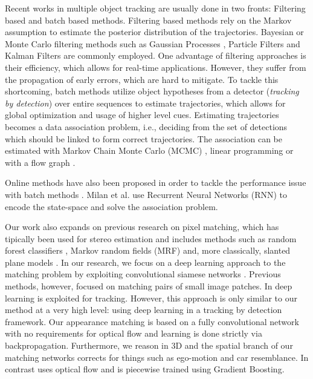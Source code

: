 \documentclass[letterpaper, 10 pt, conference]{ieeeconf}  \pdfminorversion=4
\begin{document}
Recent works in multiple object tracking are usually done in two fronts: Filtering based and batch based methods. Filtering based methods rely on the Markov assumption to estimate the posterior distribution of the trajectories.   Bayesian or Monte Carlo filtering methods such as Gaussian Processes \cite{urtasun20063d}, Particle Filters and Kalman Filters \cite{thrun2005probabilistic} are commonly employed. One advantage of filtering approaches is their efficiency, which allows for real-time applications. However, they suffer from the propagation of early errors, which are hard to mitigate. To tackle this shortcoming, batch methods utilize object hypotheses from a detector (\textit{tracking by detection}) over entire sequences to estimate trajectories, which allows for global optimization and usage of higher level cues. Estimating trajectories becomes a data association problem, i.e., deciding from the set of detections which should be linked to form correct trajectories. The association   can be estimated with  Markov Chain Monte Carlo (MCMC) \cite{Collins2014,choi_pami13}, linear programming \cite{berclaz,shitrit} or with a flow graph \cite{mincostflow}.

Online methods have also been proposed in order to tackle the performance issue with batch methods \cite{onlinemcf,onlinecrf}. Milan et al. \cite{milan2016online} use Recurrent Neural Networks (RNN) to encode the state-space and solve the association problem.

Our work also expands on previous research on pixel matching, which has tipically been used for stereo estimation and includes methods such as random forest classifiers \cite{rf_matching}, Markov random fields (MRF) \cite{mrf_matching} and, more classically, slanted plane models \cite{slanted_matching}. In our research, we focus on a deep learning approach to the matching problem by exploiting   convolutional siamese networks \cite{matching, stereomatching}. Previous methods, however,  focused on matching pairs of small image patches.  In \cite{damnpaper} deep learning is exploited for tracking. However, this approach is only similar to our method at a very high level: using deep learning in a tracking by detection framework. Our appearance matching is based on a fully convolutional network with no requirements for optical flow and learning is done strictly via backpropagation. Furthermore, we reason in 3D and the spatial branch of our matching networks corrects for things such as ego-motion and car resemblance. In contrast \cite{damnpaper} uses optical flow and is piecewise trained using Gradient Boosting.
\end{document}
